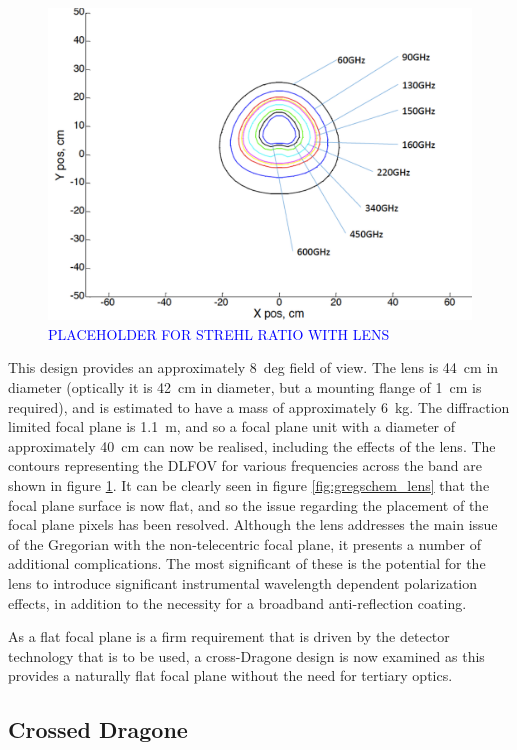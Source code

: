 \documentclass[11pt,a4paper]{article}
\newcommand{\comblue}[1]{\textcolor{blue}{#1}}
\begin{document}
\begin{figure}[htbp]
	\centering
	\includegraphics[scale=0.5]{core_nolens_strehl.png}
	\caption{\comblue{PLACEHOLDER FOR STREHL RATIO WITH LENS}}
	\label{fig:greg_lens_strehl}
\end{figure}
This design provides an approximately 8~deg field of view. The lens is 44~cm in diameter (optically it is 42~cm in diameter, but a mounting flange of 1~cm is required), and is estimated to have a mass of approximately 6~kg. The diffraction limited focal plane is 1.1~m, and so a focal plane unit with a diameter of approximately 40~cm can now be realised, including the effects of the lens. The contours representing the DLFOV for various frequencies across the band are shown in figure \ref{fig:greg_lens_strehl}. It can be clearly seen in figure \ref{fig:gregschem_lens} that the focal plane surface is now flat, and so the issue regarding the placement of the focal plane pixels has been resolved. Although the lens addresses the main issue of the Gregorian with the non-telecentric focal plane, it presents a number of additional complications. The most significant of these is the potential for the lens to introduce significant instrumental wavelength dependent polarization effects, in addition to the necessity for a broadband anti-reflection coating.

As a flat focal plane is a firm requirement that is driven by the detector technology that is to be used, a cross-Dragone design is now examined as this provides a naturally flat focal plane without the need for tertiary optics.

\subsection{Crossed Dragone}
\end{document}
